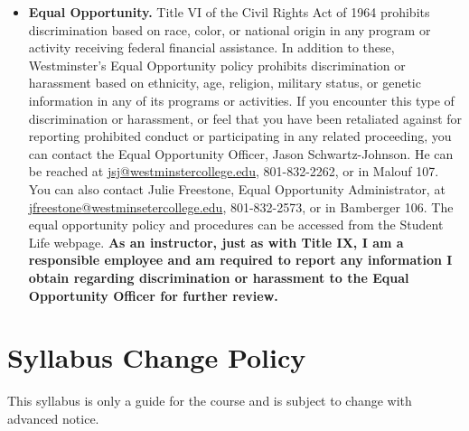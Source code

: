 \documentclass[11pt, a4paper]{article}
\begin{document}
\begin{itemize}
\item \textbf{Equal Opportunity.} Title VI of the Civil Rights Act of 1964 prohibits discrimination based on race, color, or national origin in any program or activity receiving federal financial assistance. In addition to these, Westminster's Equal Opportunity policy prohibits discrimination or harassment based on ethnicity, age, religion, military status, or genetic information in any of its programs or activities. If you encounter this type of discrimination or harassment, or feel that you have been retaliated against for reporting prohibited conduct or participating in any related proceeding, you can contact the Equal Opportunity Officer, Jason Schwartz-Johnson. He can be reached at \href{mailto:jsj@westminstercollege.edu}{jsj@westminstercollege.edu}, 801-832-2262, or in Malouf 107. You can also contact Julie Freestone, Equal Opportunity Administrator, at \href{mailto:jfreestone@westminsetercollege.edu}{jfreestone@westminsetercollege.edu}, 801-832-2573, or in Bamberger 106. The equal opportunity policy and procedures can be accessed from the Student Life webpage. \textbf{As an instructor, just as with Title IX, I am a responsible employee and am required to report any information I obtain regarding discrimination or harassment to the Equal Opportunity Officer for further review.}

\end{itemize}

\section*{Syllabus Change Policy}This syllabus is only a guide for the course and is subject to change with advanced notice.
\end{document}

